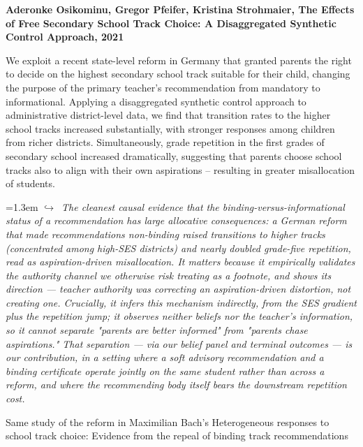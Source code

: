 \documentclass[11pt]{article}
\newcommand{\entry}[3]{%
  \par\medskip\noindent\textbf{#1}\par
  \nopagebreak #2\hspace{0.35em}{\small\color{tagcol}[#3]}\par}
\newcommand{\note}[1]{\par\smallskip\noindent\hangindent=1.3em
  \textcolor{notecol}{\footnotesize$\hookrightarrow$~\textit{#1}}}
\begin{document}
\entry{Aderonke Osikominu, Gregor Pfeifer, Kristina Strohmaier, The Effects of Free Secondary School Track Choice: A Disaggregated Synthetic Control Approach, 2021 }{We exploit a recent state-level reform in Germany that granted parents the right to decide on the highest secondary school track suitable for their child, changing the purpose of the primary teacher's recommendation from mandatory to informational. Applying a disaggregated synthetic control approach to administrative district-level data, we find that transition rates to the higher school tracks increased substantially, with stronger responses among children from richer districts. Simultaneously, grade repetition in the first grades of secondary school increased dramatically, suggesting that parents choose school tracks also to align with their own aspirations – resulting in greater misallocation of students.}{rt}
\note{The cleanest causal evidence that the binding-versus-informational status of a recommendation has large allocative consequences: a German reform that made recommendations non-binding raised transitions to higher tracks (concentrated among high-SES districts) and nearly doubled grade-five repetition, read as aspiration-driven misallocation. It matters because it empirically validates the authority channel we otherwise risk treating as a footnote, and shows its direction — teacher authority was correcting an aspiration-driven distortion, not creating one. Crucially, it infers this mechanism indirectly, from the SES gradient plus the repetition jump; it observes neither beliefs nor the teacher's information, so it cannot separate "parents are better informed" from "parents chase aspirations." That separation — via our belief panel and terminal outcomes — is our contribution, in a setting where a soft advisory recommendation and a binding certificate operate jointly on the same student rather than across a reform, and where the recommending body itself bears the downstream repetition cost.}

Same study of the reform in Maximilian Bach's Heterogeneous responses to school track choice: Evidence from the repeal of binding track recommendations
\end{document}
